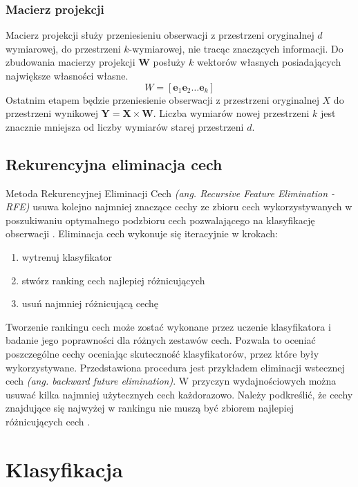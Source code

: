 \documentclass[a4paper,12pt,twoside,openany]{report}
\newcommand{\ang}[1]{\textit{(ang. #1)}}
\renewcommand{\vec}[1]{\bm{#1}}
\begin{document}
\subsubsection{Macierz projekcji}
Macierz projekcji służy przeniesieniu obserwacji z przestrzeni oryginalnej $d$ wymiarowej,
do przestrzeni $k$-wymiarowej, nie tracąc znaczących informacji.
Do zbudowania macierzy projekcji $\vec W$ posłuży $k$ wektorów własnych posiadających największe własności własne.
\begin{equation}
	W = [\vec e_1 \vec e_2 \dots \vec e_k]
\end{equation}
Ostatnim etapem będzie przeniesienie obserwacji z przestrzeni oryginalnej $X$ do przestrzeni wynikowej $\vec Y = \vec X \times \vec W$.
Liczba wymiarów nowej przestrzeni $k$ jest znacznie mniejsza od liczby wymiarów starej przestrzeni $d$.
\subsection{Rekurencyjna eliminacja cech}\label{sec:rfe}
Metoda Rekurencyjnej Eliminacji Cech \ang{Recursive Feature Elimination - RFE}
usuwa kolejno najmniej znaczące cechy ze zbioru cech wykorzystywanych
w poszukiwaniu optymalnego podzbioru cech pozwalającego na klasyfikację obserwacji \cite{Guyon2002}.
Eliminacja cech wykonuje się iteracyjnie w krokach:
\begin{enumerate}
	\item wytrenuj klasyfikator
	\item stwórz ranking cech najlepiej różnicujących
	\item usuń najmniej różnicującą cechę
\end{enumerate}
Tworzenie rankingu cech może zostać wykonane przez uczenie klasyfikatora i badanie jego poprawności dla różnych zestawów cech.
Pozwala to oceniać poszczególne cechy oceniając skuteczność klasyfikatorów, przez które były wykorzystywane.
Przedstawiona procedura jest przykładem eliminacji wstecznej cech \ang{backward future elimination}.
W przyczyn wydajnościowych można usuwać kilka najmniej użytecznych cech każdorazowo.
Należy podkreślić, że cechy znajdujące się najwyżej w rankingu nie muszą być zbiorem najlepiej różnicujących cech \cite{Guyon2002}.
\section{Klasyfikacja}
\end{document}
